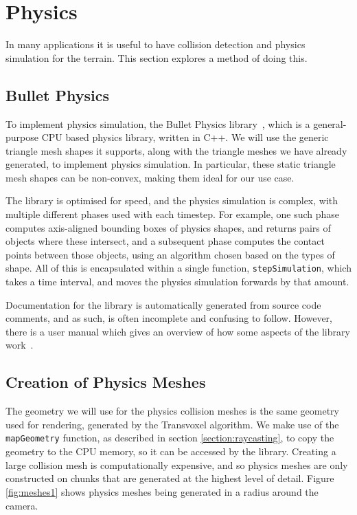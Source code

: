 \documentclass[11pt]{article}
\begin{document}
\section{Physics}
In many applications it is useful to have collision detection and physics simulation for the terrain. This section explores a method of doing this.
\subsection{Bullet Physics}
To implement physics simulation, the Bullet Physics library~\cite{bullet-physics}, which is a general-purpose CPU based physics library, written in C++. We will use the generic triangle mesh shapes it supports, along with the triangle meshes we have already generated, to implement physics simulation. In particular, these static triangle mesh shapes can be non-convex, making them ideal for our use case.

The library is optimised for speed, and the physics simulation is complex, with multiple different phases used with each timestep. For example, one such phase computes axis-aligned bounding boxes of physics shapes, and returns pairs of objects where these intersect, and a subsequent phase computes the contact points between those objects, using an algorithm chosen based on the types of shape. All of this is encapsulated within a single function, \texttt{stepSimulation}, which takes a time interval, and moves the physics simulation forwards by that amount.

Documentation for the library is automatically generated from source code comments, and as such, is often incomplete and confusing to follow. However, there is a user manual which gives an overview of how some aspects of the library work~\cite{coumans_2015}.

\subsection{Creation of Physics Meshes}
\label{section:physics_meshes}
The geometry we will use for the physics collision meshes is the same geometry used for rendering, generated by the Transvoxel algorithm. We make use of the \texttt{mapGeometry} function, as described in section \ref{section:raycasting}, to copy the geometry to the CPU memory, so it can be accessed by the library.
Creating a large collision mesh is computationally expensive, and so physics meshes are only constructed on chunks that are generated at the highest level of detail. Figure \ref{fig:meshes1} shows physics meshes being generated in a radius around the camera.
\end{document}
